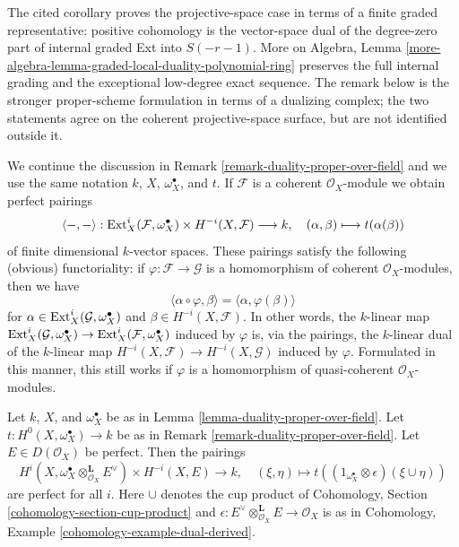 \begin{remark}
\label{remark-coherent-duality-proper-over-field}
\begin{reference}
\cite[Chapter III, \S 4, no. 72, Corollary 1, p. 267]{FAC}
\end{reference}
\begin{history}
The cited corollary proves the projective-space case in terms of a finite
graded representative: positive cohomology is the vector-space dual of the
degree-zero part of internal graded Ext into $S(-r-1)$. More on Algebra,
Lemma \ref{more-algebra-lemma-graded-local-duality-polynomial-ring}
preserves the full internal grading and the exceptional low-degree exact
sequence. The remark below is the stronger proper-scheme formulation in
terms of a dualizing complex; the two statements agree on the coherent
projective-space surface, but are not identified outside it.
\end{history}
We continue the discussion in Remark \ref{remark-duality-proper-over-field}
and we use the same notation $k$, $X$, $\omega_X^\bullet$, and $t$.
If $\mathcal{F}$ is a coherent $\mathcal{O}_X$-module we obtain
perfect pairings
$$
\langle -, - \rangle :
\mathop{\mathrm{Ext}}\nolimits^i_X(\mathcal{F}, \omega_X^\bullet) \times H^{-i}(X,\mathcal{F})
\longrightarrow k,\quad
(\alpha, \beta) \longmapsto t(\alpha(\beta))
$$
of finite dimensional $k$-vector spaces. These pairings satisfy the
following (obvious) functoriality: if $\varphi : \mathcal{F} \to \mathcal{G}$
is a homomorphism of coherent $\mathcal{O}_X$-modules, then we have
$$
\langle \alpha \circ \varphi, \beta \rangle =
\langle \alpha, \varphi(\beta) \rangle
$$
for $\alpha \in \mathop{\mathrm{Ext}}\nolimits^i_X(\mathcal{G}, \omega_X^\bullet)$ and
$\beta \in H^{-i}(X, \mathcal{F})$. In other words, the $k$-linear map
$\mathop{\mathrm{Ext}}\nolimits^i_X(\mathcal{G}, \omega_X^\bullet) \to
\mathop{\mathrm{Ext}}\nolimits^i_X(\mathcal{F}, \omega_X^\bullet)$ induced by $\varphi$
is, via the pairings, the $k$-linear dual of the $k$-linear map
$H^{-i}(X, \mathcal{F}) \to H^{-i}(X, \mathcal{G})$ induced
by $\varphi$. Formulated in this manner, this still works if
$\varphi$ is a homomorphism of quasi-coherent $\mathcal{O}_X$-modules.
\end{remark}

\begin{lemma}
\label{lemma-duality-proper-over-field-perfect}
Let $k$, $X$, and $\omega_X^\bullet$
be as in Lemma \ref{lemma-duality-proper-over-field}.
Let $t : H^0(X, \omega_X^\bullet) \to k$ be as in
Remark \ref{remark-duality-proper-over-field}.
Let $E \in D(\mathcal{O}_X)$ be perfect. Then the pairings
$$
H^i(X, \omega_X^\bullet \otimes_{\mathcal{O}_X}^\mathbf{L} E^\vee)
\times
H^{-i}(X, E) \longrightarrow k, \quad
(\xi, \eta) \longmapsto
t((1_{\omega_X^\bullet} \otimes \epsilon)(\xi \cup \eta))
$$
are perfect for all $i$. Here $\cup$ denotes the cup product
of Cohomology, Section \ref{cohomology-section-cup-product} and
$\epsilon : E^\vee \otimes_{\mathcal{O}_X}^\mathbf{L} E \to \mathcal{O}_X$
is as in Cohomology, Example \ref{cohomology-example-dual-derived}.
\end{lemma}

